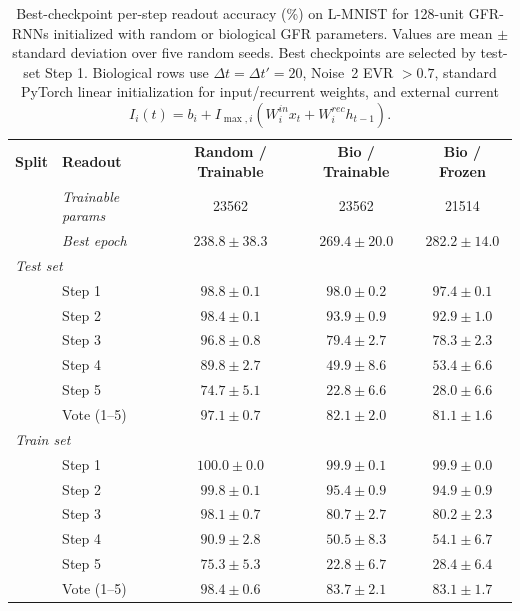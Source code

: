 \begin{table}[t]
    \caption{Best-checkpoint per-step readout accuracy (\%) on L-MNIST for 128-unit GFR-RNNs initialized with random or biological GFR parameters. Values are mean $\pm$ standard deviation over five random seeds. Best checkpoints are selected by test-set Step 1. Biological rows use $\Delta t=\Delta t'=20$, Noise~2 EVR $>0.7$, standard PyTorch linear initialization for input/recurrent weights, and external current $I_i(t)=b_i+I_{\max,i}(W^{in}_i x_t+W^{rec}_i h_{t-1})$.}
    \label{tab:bio-init-per-step-percent}
    \centering
    \small
    \setlength{\tabcolsep}{4pt}
    \begin{tabular}{llccc}
    \toprule
    \textbf{Split} & \textbf{Readout} & \textbf{Random / Trainable} & \textbf{Bio / Trainable} & \textbf{Bio / Frozen} \\
    & \textit{Trainable params} & 23562 & 23562 & 21514 \\
    & \textit{Best epoch} & $238.8 \pm 38.3$ & $269.4 \pm 20.0$ & $282.2 \pm 14.0$ \\
    \midrule
    \multicolumn{5}{l}{\textit{Test set}} \\
    & Step 1 & $98.8 \pm 0.1$ & $98.0 \pm 0.2$ & $97.4 \pm 0.1$ \\
    & Step 2 & $98.4 \pm 0.1$ & $93.9 \pm 0.9$ & $92.9 \pm 1.0$ \\
    & Step 3 & $96.8 \pm 0.8$ & $79.4 \pm 2.7$ & $78.3 \pm 2.3$ \\
    & Step 4 & $89.8 \pm 2.7$ & $49.9 \pm 8.6$ & $53.4 \pm 6.6$ \\
    & Step 5 & $74.7 \pm 5.1$ & $22.8 \pm 6.6$ & $28.0 \pm 6.6$ \\
    & Vote (1--5) & $97.1 \pm 0.7$ & $82.1 \pm 2.0$ & $81.1 \pm 1.6$ \\
    \midrule
    \multicolumn{5}{l}{\textit{Train set}} \\
    & Step 1 & $100.0 \pm 0.0$ & $99.9 \pm 0.1$ & $99.9 \pm 0.0$ \\
    & Step 2 & $99.8 \pm 0.1$ & $95.4 \pm 0.9$ & $94.9 \pm 0.9$ \\
    & Step 3 & $98.1 \pm 0.7$ & $80.7 \pm 2.7$ & $80.2 \pm 2.3$ \\
    & Step 4 & $90.9 \pm 2.8$ & $50.5 \pm 8.3$ & $54.1 \pm 6.7$ \\
    & Step 5 & $75.3 \pm 5.3$ & $22.8 \pm 6.7$ & $28.4 \pm 6.4$ \\
    & Vote (1--5) & $98.4 \pm 0.6$ & $83.7 \pm 2.1$ & $83.1 \pm 1.7$ \\
    \bottomrule
    \end{tabular}
\end{table}
